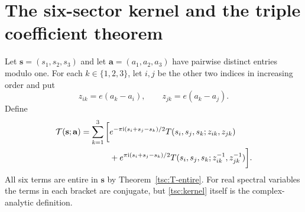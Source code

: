 \section{The six-sector kernel and the triple coefficient theorem}\label{tsc:triple}
Let $\mathbf s=(s_1,s_2,s_3)$ and let $\mathbf a=(a_1,a_2,a_3)$ have
pairwise distinct entries modulo one. For each $k\in\{1,2,3\}$, let $i,j$
be the other two indices in increasing order and put
\begin{equation}\label{tsc:colors}
 z_{ik}=e(a_k-a_i),\qquad z_{jk}=e(a_k-a_j).
\end{equation}
Define
\begin{align}\label{tsc:kernel}
 \mathcal T(\mathbf s;\mathbf a)=\sum_{k=1}^3\bigg[&
  e^{-\pi\mathrm i(s_i+s_j-s_k)/2}
       T(s_i,s_j,s_k;z_{ik},z_{jk})\notag\\
 &+e^{\pi\mathrm i(s_i+s_j-s_k)/2}
       T(s_i,s_j,s_k;z_{ik}^{-1},z_{jk}^{-1})\bigg].
\end{align}
All six terms are entire in $\mathbf s$ by Theorem~\ref{tsc:T-entire}.
For real spectral variables the terms in each bracket are conjugate, but
\eqref{tsc:kernel} itself is the complex-analytic definition.

